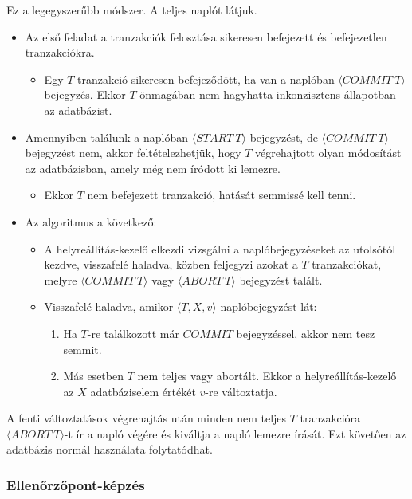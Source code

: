 \documentclass[12pt,margin=0px]{article}
\begin{document}
    \noindent Ez a legegyszerűbb módszer. A teljes naplót látjuk.
    \begin{itemize}
        \item Az első feladat a tranzakciók felosztása sikeresen befejezett és befejezetlen tranzakciókra.
        \begin{itemize}
            \item Egy $T$ tranzakció sikeresen befejeződött, ha van a naplóban $\langle COMMIT \ T \rangle$ bejegyzés. Ekkor $T$ önmagában nem hagyhatta inkonzisztens állapotban az adatbázist.
        \end{itemize}
        \item Amennyiben találunk a naplóban $\langle START \ T \rangle$ bejegyzést, de $\langle COMMIT \ T \rangle$ bejegyzést nem, akkor feltételezhetjük, hogy $T$ végrehajtott olyan módosítást az adatbázisban, amely még nem íródott ki lemezre.
        \begin{itemize}
            \item Ekkor $T$ nem befejezett tranzakció, hatását semmissé kell tenni.
        \end{itemize}
	    \item Az algoritmus a következő:
        \begin{itemize}
	       \item A helyreállítás-kezelő elkezdi vizsgálni a naplóbejegyzéseket az utolsótól kezdve, visszafelé haladva, közben feljegyzi azokat a $T$ tranzakciókat, melyre $\langle COMMIT \ T \rangle$ vagy $\langle ABORT \ T \rangle$ bejegyzést talált.
           \item Visszafelé haladva, amikor $\langle T,X,v\rangle$ naplóbejegyzést lát:
           	\begin{enumerate}
        		\item	Ha $T$-re találkozott már $COMMIT$ bejegyzéssel, akkor nem tesz semmit.
    	   	    \item	Más esetben $T$ nem teljes vagy abortált. Ekkor a helyreállítás-kezelő az $X$ adatbáziselem értékét $v$-re változtatja.
    	   \end{enumerate}
        \end{itemize}
	\end{itemize}
	
	\noindent A fenti változtatások végrehajtás után minden nem teljes $T$ tranzakcióra $\langle ABORT \ T \rangle$-t ír a napló végére és kiváltja a napló lemezre írását. Ezt követően az adatbázis normál használata folytatódhat.
	
	\subsubsection*{Ellenőrzőpont-képzés}
	
\end{document}
